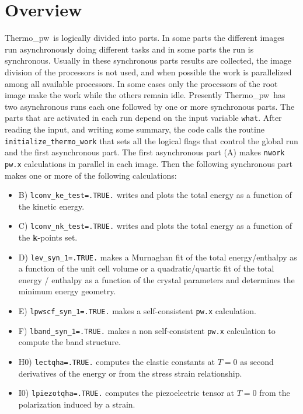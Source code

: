 \documentclass[12pt,a4paper,twoside]{report}
\def\tpw{{\sc Thermo}\_{\sc pw}}
\begin{document}
{\color{coral}\section{Overview}}
\color{black}
\tpw\ is logically divided into parts. In some parts the different
images run asynchronously doing different tasks and in some parts the
run is synchronous. Usually in these synchronous parts results are 
collected, the image division of the processors is not used, and when possible
the work is parallelized among all available processors. In some cases
only the processors of the root image make the work while the others remain
idle.
Presently \tpw\ has two asynchronous runs each one followed
by one or more synchronous parts. The parts that are activated in
each run depend on the input variable \texttt{what}. After reading the input,
and writing some summary, the code calls the routine 
\texttt{initialize\_thermo\_work} that sets all the
logical flags that control the global run and the first asynchronous
part. The first asynchronous part (A) makes \texttt{nwork} \texttt{pw.x} 
calculations in parallel in each image. 
Then the following synchronous part makes one or more of
the following calculations:
\begin{itemize}

\item
B) \texttt{lconv\_ke\_test=.TRUE.} writes and plots the total
energy as a function of the kinetic energy.

\item
C) \texttt{lconv\_nk\_test=.TRUE.} writes and plots the total energy
as a function of the {\bf k}-points set.

\item
D) \texttt{lev\_syn\_1=.TRUE.} makes a Murnaghan fit of the 
total energy/enthalpy as a function of the unit cell volume or 
a quadratic/quartic fit of the total energy / enthalpy as a function 
of the crystal parameters and determines the minimum energy geometry.

\item
E) \texttt{lpwscf\_syn\_1=.TRUE.} makes a self-consistent \texttt{pw.x} 
calculation.

\item
F) \texttt{lband\_syn\_1=.TRUE.} makes a non self-consistent \texttt{pw.x}
calculation to compute the band structure.

\item
H0) \texttt{lectqha=.TRUE.} computes the elastic constants at $T=0$
as second derivatives of the energy or from the stress strain relationship. 

\item 
I0) \texttt{lpiezotqha=.TRUE.} computes the piezoelectric tensor at $T=0$
from the polarization induced by a strain.

\end{itemize}
\end{document}
